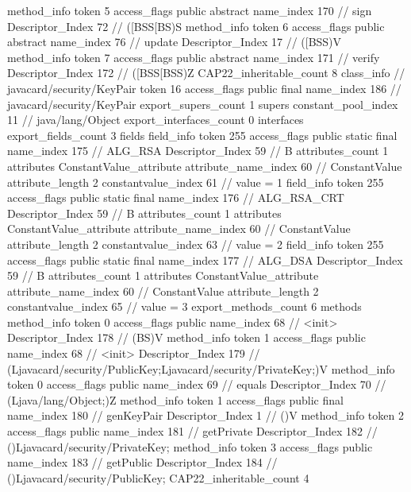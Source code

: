 {{{{{				}
				method_info {
					token	5
					access_flags	public abstract
					name_index	170		// sign
					Descriptor_Index	72		// ([BSS[BS)S
				}
				method_info {
					token	6
					access_flags	public abstract
					name_index	76		// update
					Descriptor_Index	17		// ([BSS)V
				}
				method_info {
					token	7
					access_flags	public abstract
					name_index	171		// verify
					Descriptor_Index	172		// ([BSS[BSS)Z
				}
			}
			CAP22_inheritable_count	8
		}
		class_info {		// javacard/security/KeyPair
			token	16
			access_flags	public final
			name_index	186		// javacard/security/KeyPair
			export_supers_count	1
			supers {
				constant_pool_index	11		// java/lang/Object
			}
			export_interfaces_count	0
			interfaces {
			}
			export_fields_count	3
			fields {
			field_info {
				token	255
				access_flags	public static final
				name_index	175		// ALG_RSA
				Descriptor_Index	59		// B
				attributes_count	1
				attributes {
				ConstantValue_attribute {
					attribute_name_index	60		// ConstantValue
					attribute_length	2
					constantvalue_index	61		// value = 1
				}
				}
			}
			field_info {
				token	255
				access_flags	public static final
				name_index	176		// ALG_RSA_CRT
				Descriptor_Index	59		// B
				attributes_count	1
				attributes {
				ConstantValue_attribute {
					attribute_name_index	60		// ConstantValue
					attribute_length	2
					constantvalue_index	63		// value = 2
				}
				}
			}
			field_info {
				token	255
				access_flags	public static final
				name_index	177		// ALG_DSA
				Descriptor_Index	59		// B
				attributes_count	1
				attributes {
				ConstantValue_attribute {
					attribute_name_index	60		// ConstantValue
					attribute_length	2
					constantvalue_index	65		// value = 3
				}
				}
			}
			}
			export_methods_count	6
			methods {
				method_info {
					token	0
					access_flags	public
					name_index	68		// <init>
					Descriptor_Index	178		// (BS)V
				}
				method_info {
					token	1
					access_flags	public
					name_index	68		// <init>
					Descriptor_Index	179		// (Ljavacard/security/PublicKey;Ljavacard/security/PrivateKey;)V
				}
				method_info {
					token	0
					access_flags	public
					name_index	69		// equals
					Descriptor_Index	70		// (Ljava/lang/Object;)Z
				}
				method_info {
					token	1
					access_flags	public final
					name_index	180		// genKeyPair
					Descriptor_Index	1		// ()V
				}
				method_info {
					token	2
					access_flags	public
					name_index	181		// getPrivate
					Descriptor_Index	182		// ()Ljavacard/security/PrivateKey;
				}
				method_info {
					token	3
					access_flags	public
					name_index	183		// getPublic
					Descriptor_Index	184		// ()Ljavacard/security/PublicKey;
				}
			}
			CAP22_inheritable_count	4
		}
	}
}
